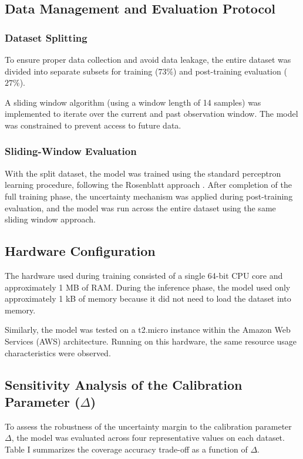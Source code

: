 \documentclass[conference]{IEEEtran}
\begin{document}
\subsection{Data Management and Evaluation Protocol}

\subsubsection{Dataset Splitting}

To ensure proper data collection and avoid data leakage, the entire dataset was divided into separate subsets for training ($73\%$) and post-training evaluation ($27\%$).

A sliding window algorithm (using a window length of 14 samples) was implemented to iterate over the current and past observation window. The model was constrained to prevent access to future data.

\subsubsection{Sliding-Window Evaluation}

With the split dataset, the model was trained using the standard perceptron learning procedure, following the Rosenblatt approach \cite{b7}. After completion of the full training phase, the uncertainty mechanism was applied during post-training evaluation, and the model was run across the entire dataset using the same sliding window approach.

\subsection{Hardware Configuration}

The hardware used during training consisted of a single 64-bit CPU core and approximately 1 MB of RAM. During the inference phase, the model used only approximately 1 kB of memory because it did not need to load the dataset into memory.

Similarly, the model was tested on a t2.micro instance within the Amazon Web Services (AWS) architecture. Running on this hardware, the same resource usage characteristics were observed.

\subsection{Sensitivity Analysis of the Calibration Parameter ($\Delta$)}

To assess the robustness of the uncertainty margin to the calibration parameter $\Delta$, the model was evaluated across four representative values on each dataset. Table I summarizes the coverage accuracy trade-off as a function of $\Delta$.
\end{document}
